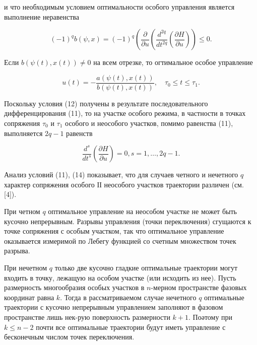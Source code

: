 \documentclass[10pt]{article}
\begin{document}
и что необходимым условием оптимальности особого управления является выполнение неравенства



\[

(-1)^{q} b(\psi, x)=(-1)^{q}\left(\frac{\partial}{\partial u}\left(\frac{d^{2 q}}{d t^{2 q}}\left(\frac{\partial H}{\partial u}\right)\right) \leqslant 0 .\right.

\]



Если $b(\psi(t), x(t)) \neq 0$ на всем отрезке, то огтимальное особое управление



\[

u(t)=-\frac{a(\psi(t), x(t))}{b(\psi(t), x(t))}, \quad \tau_{0} \leqslant t \leqslant \tau_{1} .

\]



Поскольку условия (12) получены в результате последовательного дифференцирования (11), то на участке особого режима, в частности в точках сопряжения $\tau_{0}$ и $\tau_{1}$ особого и неособого участков, помимо равенства (11), выполняется $2 q-1$ равенств



\[

\frac{d^{s}}{d t^{s}}\left(\frac{\partial H}{\partial u}\right)=0, s=1, \ldots, 2 q-1 .

\]



Анализ условий (11), (14) показывает, что для случаев четного и нечетного $q$ характер сопряжения особого ІІ неособого участков траектории различен (см. [4]).



При четном $q$ оптимальное управление на неособом участке не может быть кусочно непрерывным. Разрывы управления (точки переключения) сгущаются к точке сопряжения с особым участком, так что оптимальное управление оказывается измеримой по Лебегу функцией со счетным множеством точек разрыва.



При нечетном $q$ только две кусочно гладкие оптимальные траектории могут входить в точку, лежащую на особом участке (или исходить из нее). Пусть размерность многообразия особых участков в $n$-мерном пространстве фазовых координат равна $k$. Тогда в рассматриваемом случае нечетного $q$ оптимальные траектории с кусочно непрерывным управлением заполняют в фазовом пространстве лишь нек-рую поверхность размерности $k+1$. Поәтому при $k \leqslant n-2$ почти все оптимальные траектории будут иметь управление с бесконечным числом точек переключения.
\end{document}
